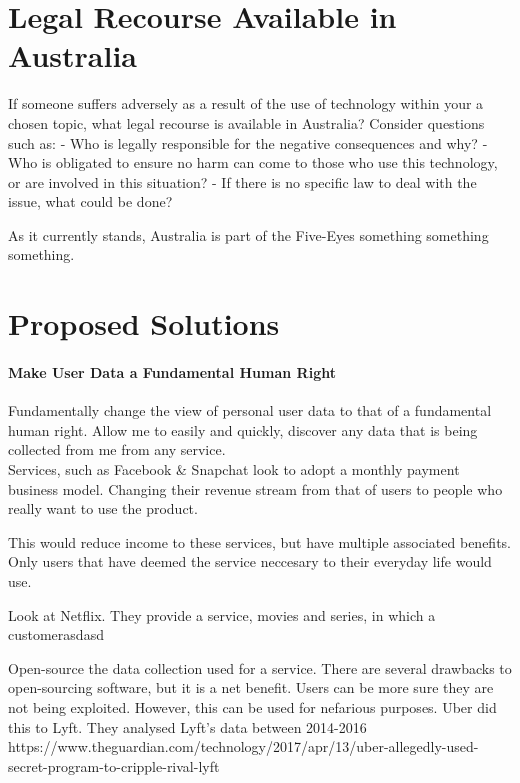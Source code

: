 \documentclass[12pt,a4paper]{article}
\begin{document}

\section{Legal Recourse Available in Australia}

If someone suffers adversely as a result of the use of technology within your a chosen topic, what legal recourse is
available in Australia? Consider questions such as:
- Who is legally responsible for the negative consequences and why?
- Who
is obligated to ensure no harm can come to those who use this technology, or are involved
in this situation?
- If there
is no specific law to deal with the issue, what could be done?


As it currently stands, Australia is part of the Five-Eyes something something something.




\section{Proposed Solutions}

\paragraph{Make User Data a Fundamental Human Right}

Fundamentally change the view of personal user data to that of a fundamental human right. Allow me to easily and quickly, discover any data that is being collected from me from any service.\\

Services, such as Facebook & Snapchat look to adopt a monthly payment business model. Changing their revenue stream from that of users to people who really want to use the product.

This would reduce income to these services, but have multiple associated benefits. Only users that have deemed the service neccesary to their everyday life would use.

Look at Netflix. They provide a service, movies and series, in which a customerasdasd 

Open-source the data collection used for a service. There are several drawbacks to open-sourcing software, but it is a net benefit. Users can be more sure they are not being exploited. 
However, this can be used for nefarious purposes. Uber did this to Lyft. They analysed Lyft's data between 2014-2016
https://www.theguardian.com/technology/2017/apr/13/uber-allegedly-used-secret-program-to-cripple-rival-lyft
\end{document}
